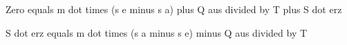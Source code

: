 Zero equals m dot times (s e minus s a) plus Q aus divided by T plus S dot erz

S dot erz equals m dot times (s a minus s e) minus Q aus divided by T